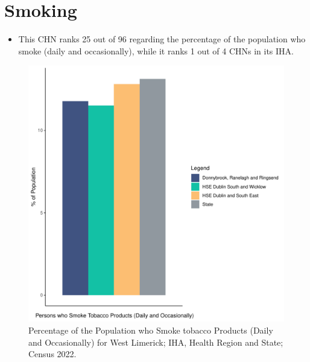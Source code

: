 \documentclass{article}
\begin{document}
\pagebreak

\section{Smoking}\label{sect:Smoking}
\begin{itemize}
\item This CHN ranks  25 out of 96 regarding the percentage of the population who smoke (daily and occasionally), while it ranks   1 out of 4 CHNs in its IHA.
\end{itemize}
\begin{figure}[H]
	\centering
	\includegraphics[width = 120mm]{../figures/SmokingED.pdf}
	\caption{Percentage of the Population who Smoke tobacco Products (Daily and Occasionally) for West Limerick; IHA, Health Region and State; Census 2022.}
	\label{fig:2ae19629-1a6a-13a3-e055-000000000001}
	\end{figure}
	
\end{document}
